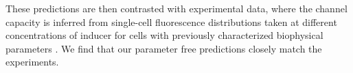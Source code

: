 These predictions are then contrasted with experimental data, where the channel
capacity is inferred from single-cell fluorescence distributions taken at
different concentrations of inducer for cells with previously characterized
biophysical parameters \cite{Garcia2011c, Razo-Mejia2018}. We find that our
parameter free predictions closely match the experiments.
